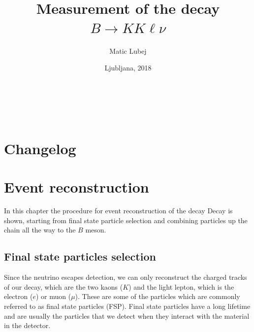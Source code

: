 \documentclass[oneside,a4paper,openany,12pt]{scrbook}
\title{\huge {Measurement of the decay $B \to KK\ell\nu$}}
\author{Matic Lubej}
\begin{document}
\date{Ljubljana, 2018}
\begin{titlingpage} %
\begin{center}

\textbf{\thetitle}\\
\theauthor \\
\vspace{0cm}
\thedate
\end{center}
\end{titlingpage}

\pagestyle{plain}

\chapter*{Changelog}

\tableofcontents
{}



%

\chapter{Event reconstruction}

In this chapter the procedure for event reconstruction of the decay Decay is shown, starting from final state particle selection and combining particles up the chain all the way to the $B$ meson. 

\section{Final state particles selection}

Since the neutrino escapes detection, we can only reconstruct the charged tracks of our decay, which are the two kaons ($K$) and the light lepton, which is the electron ($e$) or muon ($\mu$). These are some of the particles which are commonly referred to as final state particles (FSP). Final state particles have a long lifetime and are usually the particles that we detect when they interact with the material in the detector.
\end{document}
